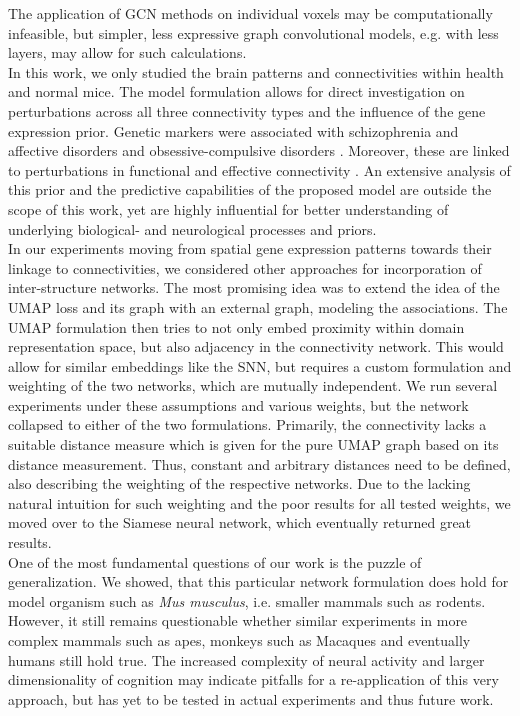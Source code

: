 \documentclass[]{article}
\renewcommand{\cite}{\citep}
\begin{document}
The application of GCN methods on individual voxels may be computationally infeasible, but simpler, less expressive graph convolutional models, e.g. with less layers, may allow for such calculations.\\

In this work, we only studied the brain patterns and connectivities within health and normal mice. The model formulation allows for direct investigation on perturbations across all three connectivity types and the influence of the gene expression prior. Genetic markers were associated with schizophrenia and affective disorders \cite{blackwood2001schizophrenia} and obsessive-compulsive disorders \cite{hall2003sequence}. Moreover, these are linked to perturbations in functional and effective connectivity \cite{friston2002dysfunctional, friston2011functional}. An extensive analysis of this prior and the predictive capabilities of the proposed model are outside the scope of this work, yet are highly influential for better understanding of underlying biological- and neurological processes and priors.\\

In our experiments moving from spatial gene expression patterns towards their linkage to connectivities, we considered other approaches for incorporation of inter-structure networks. The most promising idea was to extend the idea of the UMAP loss and its graph with an external graph, modeling the associations. The UMAP formulation then tries to not only embed proximity within domain representation space, but also adjacency in the connectivity network. This would allow for similar embeddings like the SNN, but requires a custom formulation and weighting of the two networks, which are mutually independent. We run several experiments under these assumptions and various weights, but the network collapsed to either of the two formulations. Primarily, the connectivity lacks a suitable distance measure which is given for the pure UMAP graph based on its distance measurement. Thus, constant and arbitrary distances need to be defined, also describing the weighting of the respective networks. Due to the lacking natural intuition for such weighting and the poor results for all tested weights, we moved over to the Siamese neural network, which eventually returned great results.\\

One of the most fundamental questions of our work is the puzzle of generalization. We showed, that this particular network formulation does hold for model organism such as \textit{Mus musculus}, i.e. smaller mammals such as rodents. However, it still remains questionable whether similar experiments in more complex mammals such as apes, monkeys such as Macaques \cite{ValkShapingBrainStructure2020} and eventually humans still hold true. The increased complexity of neural activity and larger dimensionality of cognition may indicate pitfalls for a re-application of this very approach, but has yet to be tested in actual experiments and thus future work.\\
\end{document}
